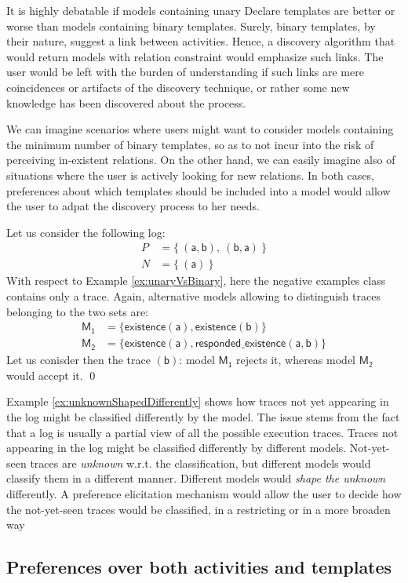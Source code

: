 It is highly debatable if models containing unary Declare templates are better or worse than models containing binary templates. Surely, binary templates, by their nature, suggest a link between activities. Hence, a discovery algorithm that would return models with relation constraint would emphasize such links. The user would be left with the burden of understanding if such links are mere coincidences or artifacts of the discovery technique, or rather some new knowledge has been discovered about the process.

We can imagine scenarios where users might want to consider models containing the minimum number of binary templates, so as to not incur into the risk of perceiving in-existent relations. On the other hand, we can easily imagine also of situations where the user is actively looking for new relations. In both cases, preferences about which templates should be included into a model would allow the user to adpat the discovery process to her needs.

\begin{example}
\label{ex:unknownShapedDifferently}
Let us consider the following log:
\begin{align*}
P & = \{\ (\mathsf{a}, \mathsf{b}),\ (\mathsf{b}, \mathsf{a})\ \} \\
N & = \{\ (\mathsf{a})\ \}
\end{align*}
%
With respect to Example \ref{ex:unaryVsBinary}, here the negative examples class contains only a trace. Again, alternative models allowing to distinguish traces belonging to the two sets are:
\begin{align*}
\mathsf{M_1} & = \{ \mathsf{existence(a),existence(b)}\} \\
\mathsf{M_2} & = \{ \mathsf{existence(a), responded\_existence(a, b)}\}
\end{align*}
%
Let us conisder then the trace $\mathsf{(b)}$: model $\mathsf{M_1}$ rejects it, whereas model $\mathsf{M_2}$ would accept it.
\qed
\end{example}
Example \ref{ex:unknownShapedDifferently} shows how traces not yet appearing in the log might be classified differently by the model. The issue stems from the fact that a log is usually a partial view of all the possible execution traces. Traces not appearing in the log might be classified differently by different models. Not-yet-seen traces are \emph{unknown} w.r.t. the classification, but different models would classify them in a different manner. Different models would \emph{shape the unknown} differently.
%
A preference elicitation mechanism would allow the user to decide how the not-yet-seen traces would be classified, in a restricting or in a more broaden way



\subsection{Preferences over both activities and templates}

